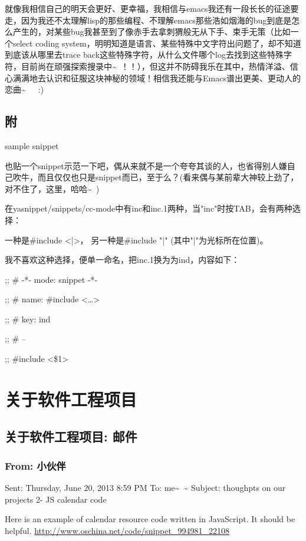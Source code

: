 \documentclass[12pt]{book}
\begin{document}
就像我相信自己的明天会更好、更幸福，我相信与emacs我还有一段长长的征途要走，因为我还不太理解lisp的那些编程、不理解emacs那些浩如烟海的bug到底是怎么产生的，对某些bug我甚至到了像赤手去拿刺猬般无从下手、束手无策（比如一个select coding system，明明知道是语言、某些特殊中文字符出问题了，却不知道到底该从哪里去trace back这些特殊字符，从什么文件哪个log去找到这些特殊字符，目前尚在顽强探索搜录中\textasciitilde{}~！！），但这并不防碍我乐在其中，热情洋溢、信心满满地去认识和征服这块神秘的领域！相信我还能与Emacs谱出更美、更动人的恋曲\textasciitilde{}~　:)

\section{附}
\label{sec-6-12}

sample snippet

也贴一个snippet示范一下吧，偶从来就不是一个夸夸其谈的人，也省得别人嫌自己吹牛，而且仅仅也只是snippet而已，至于么？(看来偶与某前辈大神较上劲了，对不住了，这里，哈哈\textasciitilde{}~)

在yasnippet/snippets/cc-mode中有inc和inc.1两种，当"inc"时按TAB，会有两种选择：

一种是\#include <|>，
另一种是\#include "|" (其中"|"为光标所在位置)。

我不喜欢这种选择，便单一命名，把inc.1换为为ind，内容如下：

;; \# -*- mode: snippet -*-

;; \# name: \#include <\ldots{}>

;; \# key: ind

;; \# --

;; \#include <\$1> 

\chapter{关于软件工程项目}
\label{sec-7}
\section{关于软件工程项目: 邮件}
\label{sec-7-1}
\subsection{From: 小伙伴}
\label{sec-7-1-1}
Sent: Thursday, June 20, 2013 8:59 PM
To: me\textasciitilde{}~\textasciitilde{}
Subject: thoughpts on our projects 2- JS calendar code

Here is an example of calendar resource code written in JavaScript. It should be helpful.
\url{http://www.oschina.net/code/snippet_994981_22108}
\end{document}
